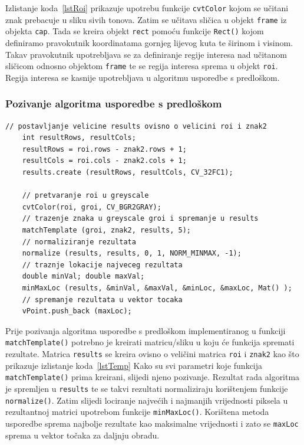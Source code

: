 Izlistanje koda~\ref{lstRoi} prikazuje upotrebu funkcije
\texttt{cvtColor} kojom se učitani znak prebacuje u sliku sivih tonova.
Zatim se učitava sličica u objekt \texttt{frame} iz objekta
\texttt{cap}. Tada se kreira objekt \texttt{rect} pomoću funkcije
\texttt{Rect()} kojom definiramo pravokutnik koordinatama gornjeg
lijevog kuta te širinom i visinom. Takav pravokutnik upotrebljava se za
definiranje regije interesa nad učitanom sličicom odnosno objektom
\texttt{frame} te se regija interesa sprema u objekt \texttt{roi}.
Regija interesa se kasnije upotrebljava u algoritmu usporedbe s
predloškom.


\newpage
\subsubsection{Pozivanje algoritma usporedbe s predloškom} %
\label{ssub:Pozivanje algoritma usporedbe s predloškom}

\begin{lstlisting}[label=lstTemp,caption={Izvorni kod pozivanja
algoritma usporedbe s predloškom}]
    // postavljanje velicine results ovisno o velicini roi i znak2
    int resultRows, resultCols;
    resultRows = roi.rows - znak2.rows + 1;
    resultCols = roi.cols - znak2.cols + 1;
    results.create (resultRows, resultCols, CV_32FC1);

    // pretvaranje roi u greyscale
    cvtColor(roi, groi, CV_BGR2GRAY);      
    // trazenje znaka u greyscale groi i spremanje u results
    matchTemplate (groi, znak2, results, 5);
    // normaliziranje rezultata
    normalize (results, results, 0, 1, NORM_MINMAX, -1);
    // traznje lokacije najveceg rezultata
    double minVal; double maxVal;
    minMaxLoc (results, &minVal, &maxVal, &minLoc, &maxLoc, Mat() );
    // spremanje rezultata u vektor tocaka
    vPoint.push_back (maxLoc);

\end{lstlisting}

Prije pozivanja algoritma usporedbe s predloškom implementiranog u
funkciji \texttt{matchTemplate()} potrebno je kreirati matricu/sliku u
koju će funkcija spremati rezultate. Matrica \texttt{results} se kreira
ovisno o veličini matrica \texttt{roi} i \texttt{znak2} kao što
prikazuje izlistanje koda~\ref{lstTemp} Kako su svi parametri koje
funkcija \texttt{matchTemplate()} prima kreirani, slijedi njeno pozivanje.
Rezultat rada algoritma je spremljen u \texttt{results} te se takvi
rezultati normaliziraju korištenjem funkcije \texttt{normalize()}. Zatim
slijedi lociranje najvećih i najmanjih vrijednosti piksela u rezultantnoj
matrici upotrebom funkcije \texttt{minMaxLoc()}. Korištena metoda
usporedbe sprema najbolje rezultate kao maksimalne vrijednosti i zato se
\texttt{maxLoc} sprema u vektor točaka za daljnju obradu.

